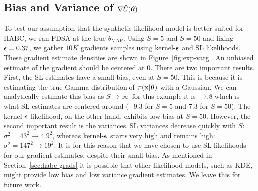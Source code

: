 \documentclass[]{article}
\begin{document}
\subsection{Bias and Variance of $\nabla \hat{U}({\bm \theta})$}
\vspace{-0.1in}
To test our assumption that the synthetic-likelihood model is better suited for HABC, we ran FDSA at the true $\theta_{\text{MAP}}$.  Using $S=5$ and $S=50$ and fixing $\epsilon = 0.37$, we gather $10K$ gradients samples using kernel-${\bm {\epsilon}}$ and SL likelihoods.  These gradient estimate densities are shown in Figure~\ref{fig:exp-varg}.  An unbiased estimate of the gradient should be centered at $0$.  There are two important results.  First, the SL estimates have a small bias, even at $S=50$.  This is because it is estimating the true Gamma distribution of $\pi({\bf x}|{\bm \theta})$ with a Gaussian.  We can analytically estimate this bias as $S \rightarrow \infty$; for this example it is $-7.8$ which is what SL estimates are centered around ($-9.3$ for $S=5$ and $7.3$ for $S=50$).  The kernel-${\bm {\epsilon}}$ likelihood, on the other hand, exhibits low bias at $S=50$.  However, the second important result is the variances.  SL variances decrease quickly with $S$: $\sigma^2 = 43^2 \rightarrow 4.9^2$, whereas kernel-${\bm {\epsilon}}$ starts very high and remains high: $\sigma^2 = 147^2 \rightarrow 19^2$.  It is for this reason that we have chosen to use SL likelihoods for our gradient estimates, despite their small bias. As mentioned in Section~\ref{sec:habc-grads} it is possible that other likelihood models, such as KDE, might provide low bias and low variance gradient estimates.  We leave this for future work.
%
\end{document}
